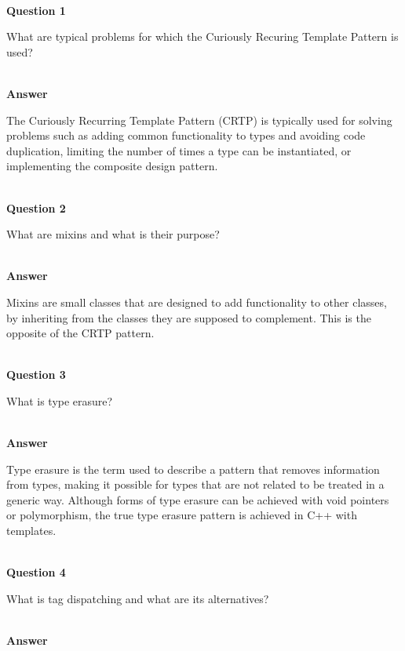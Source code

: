\hspace*{\fill} \\ %
\noindent
\textbf{Question 1}

What are typical problems for which the Curiously Recuring Template Pattern is used?

\hspace*{\fill} \\ %
\noindent
\textbf{Answer}

The Curiously Recurring Template Pattern (CRTP) is typically used for solving problems such as adding common functionality to types and avoiding code duplication, limiting the number of times a type can be instantiated, or implementing the composite design pattern.


\hspace*{\fill} \\ %
\noindent
\textbf{Question 2}

What are mixins and what is their purpose?

\hspace*{\fill} \\ %
\noindent
\textbf{Answer}

Mixins are small classes that are designed to add functionality to other classes, by inheriting from the classes they are supposed to complement. This is the opposite of the CRTP pattern.

\hspace*{\fill} \\ %
\noindent
\textbf{Question 3}

What is type erasure?

\hspace*{\fill} \\ %
\noindent
\textbf{Answer}

Type erasure is the term used to describe a pattern that removes information from types, making it possible for types that are not related to be treated in a generic way. Although forms of type erasure can be achieved with void pointers or polymorphism, the true type erasure pattern is achieved in C++ with templates.

\hspace*{\fill} \\ %
\noindent
\textbf{Question 4}

What is tag dispatching and what are its alternatives?

\hspace*{\fill} \\ %
\noindent
\textbf{Answer}

